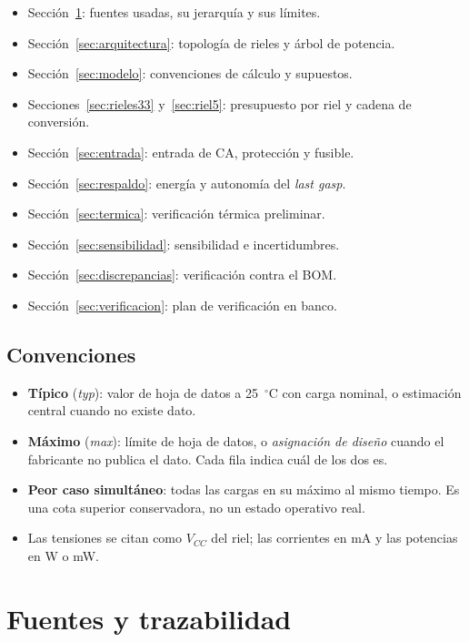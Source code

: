 \documentclass[11pt,a4paper]{article}
\begin{document}
\begin{itemize}
  \item Sección~\ref{sec:fuentes}: fuentes usadas, su jerarquía y sus límites.
  \item Sección~\ref{sec:arquitectura}: topología de rieles y árbol de potencia.
  \item Sección~\ref{sec:modelo}: convenciones de cálculo y supuestos.
  \item Secciones~\ref{sec:rieles33} y~\ref{sec:riel5}: presupuesto por riel y
        cadena de conversión.
  \item Sección~\ref{sec:entrada}: entrada de CA, protección y fusible.
  \item Sección~\ref{sec:respaldo}: energía y autonomía del \emph{last gasp}.
  \item Sección~\ref{sec:termica}: verificación térmica preliminar.
  \item Sección~\ref{sec:sensibilidad}: sensibilidad e incertidumbres.
  \item Sección~\ref{sec:discrepancias}: verificación contra el BOM.
  \item Sección~\ref{sec:verificacion}: plan de verificación en banco.
\end{itemize}

\subsection{Convenciones}

\begin{itemize}
  \item \textbf{Típico} (\emph{typ}): valor de hoja de datos a 25~$^\circ$C con
        carga nominal, o estimación central cuando no existe dato.
  \item \textbf{Máximo} (\emph{max}): límite de hoja de datos, o
        \emph{asignación de diseño} cuando el fabricante no publica el dato.
        Cada fila indica cuál de los dos es.
  \item \textbf{Peor caso simultáneo}: todas las cargas en su máximo al mismo
        tiempo. Es una cota superior conservadora, no un estado operativo real.
  \item Las tensiones se citan como $V_{CC}$ del riel; las corrientes en mA y
        las potencias en W o mW.
\end{itemize}

\section{Fuentes y trazabilidad}
\label{sec:fuentes}
\end{document}

